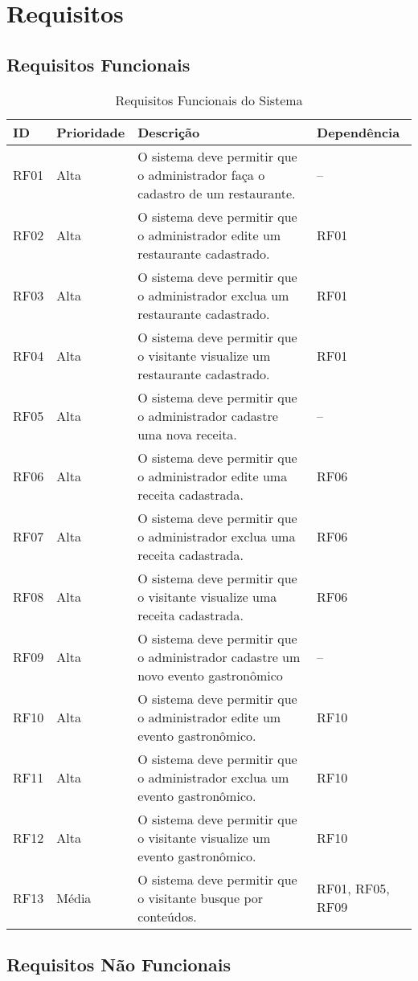 \chapter[Requisitos]{Requisitos}

\section{Requisitos Funcionais}

\begin{table}[H]
\begin{tabular}{|l|l| p{9cm} | p{3cm} |}
	\hline
	\textbf{ID} & \textbf{Prioridade} & \textbf{Descrição} & \textbf{Dependência}\tabularnewline
	\hline
	\hline
	RF01 & Alta & O sistema deve permitir que o administrador faça o cadastro de um restaurante. & --\tabularnewline
	\hline
	RF02 & Alta & O sistema deve permitir que o administrador edite um restaurante cadastrado. & RF01\tabularnewline
	\hline
	RF03 & Alta & O sistema deve permitir que o administrador exclua um restaurante cadastrado. & RF01\tabularnewline
	\hline
	RF04 & Alta & O sistema deve permitir que o visitante visualize um restaurante cadastrado. & RF01\tabularnewline
	\hline
	RF05 & Alta & O sistema deve permitir que o administrador cadastre uma nova receita. & --\tabularnewline
	\hline
	RF06 & Alta & O sistema deve permitir que o administrador edite uma receita cadastrada. & RF06\tabularnewline
	\hline
	RF07 & Alta & O sistema deve permitir que o administrador exclua uma receita cadastrada. & RF06\tabularnewline
	\hline
	RF08 & Alta & O sistema deve permitir que o visitante visualize uma receita cadastrada. & RF06\tabularnewline
	\hline
	RF09 & Alta & O sistema deve permitir que o administrador cadastre um novo evento gastronômico & --\tabularnewline
	\hline
	RF10 & Alta & O sistema deve permitir que o administrador edite um evento gastronômico. & RF10\tabularnewline
	\hline
	RF11 & Alta & O sistema deve permitir que o administrador exclua um evento gastronômico. & RF10\tabularnewline
	\hline
	RF12 & Alta & O sistema deve permitir que o visitante visualize um evento gastronômico. & RF10\tabularnewline
	\hline
	RF13 & Média & O sistema deve permitir que o visitante busque por conteúdos. & RF01, RF05, RF09\tabularnewline
	\hline
	\hline
\end{tabular}
\caption{Requisitos Funcionais do Sistema}
\label{Requisitos_Funcionais_do_Sistema}
\end{table}


\section{Requisitos Não Funcionais}

